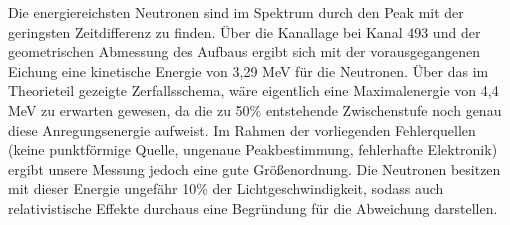 Die energiereichsten Neutronen sind im Spektrum durch den Peak mit der geringsten Zeitdifferenz zu finden. Über die Kanallage bei Kanal 493 und der geometrischen Abmessung des Aufbaus ergibt sich mit der vorausgegangenen Eichung eine kinetische Energie von 3,29 MeV für die Neutronen. Über das im Theorieteil gezeigte Zerfallsschema, wäre eigentlich eine Maximalenergie von 4,4 MeV zu erwarten gewesen, da die zu 50\% entstehende Zwischenstufe noch genau diese Anregungsenergie aufweist. Im Rahmen der vorliegenden Fehlerquellen (keine punktförmige Quelle, ungenaue Peakbestimmung, fehlerhafte Elektronik) ergibt unsere Messung jedoch eine gute Größenordnung. Die Neutronen besitzen mit dieser Energie ungefähr 10\% der Lichtgeschwindigkeit, sodass auch relativistische Effekte durchaus eine Begründung für die Abweichung darstellen. 

